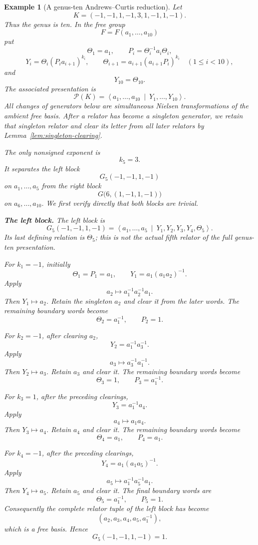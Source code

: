 \documentclass{article}
\newtheorem{example}[theorem]{Example}
\begin{document}
\begin{example}[A genus-ten Andrews--Curtis reduction]
\label{ex:genus-ten-AC-reduction}
Let
\[
 K=(-1,-1,1,-1,3,1,-1,1,-1).
\]
Thus the genus is ten.  In the free group
\[
 F=F(a_1,\ldots,a_{10})
\]
put
\[
 \Theta_1=a_1,
 \qquad
 P_i=\Theta_i^{-1}a_i\Theta_i,
\]
\[
 Y_i=\Theta_i(P_i a_{i+1})^{k_i},
 \qquad
 \Theta_{i+1}=a_{i+1}(a_{i+1}P_i)^{k_i}
 \quad(1\leq i<10),
\]
and
\[
 Y_{10}=\Theta_{10}.
\]
The associated presentation is
\[
 \mathcal P(K)=
 \left\langle
 a_1,\ldots,a_{10}
 \ \middle|\
 Y_1,\ldots,Y_{10}
 \right\rangle.
\]
All changes of generators below are simultaneous Nielsen transformations
of the ambient free basis.  After a relator has become a singleton
generator, we retain that singleton relator and clear its letter from all
later relators by Lemma~\ref{lem:singleton-clearing}.

The only nonsigned exponent is
\[
 k_5=3.
\]
It separates the left block
\[
 G_5(-1,-1,1,-1)
\]
on $a_1,\ldots,a_5$ from the right block
\[
 G\bigl(6,(1,-1,1,-1)\bigr)
\]
on $a_6,\ldots,a_{10}$.  We first verify directly that both blocks are
trivial.

\medskip
\noindent\textbf{The left block.}
The left block is
\[
 G_5(-1,-1,1,-1)
 =
 \left\langle
 a_1,\ldots,a_5
 \ \middle|\
 Y_1,Y_2,Y_3,Y_4,\Theta_5
 \right\rangle.
\]
Its last defining relation is $\Theta_5$; this is not the actual fifth
relator of the full genus-ten presentation.

For $k_1=-1$, initially
\[
 \Theta_1=P_1=a_1,
 \qquad
 Y_1=a_1(a_1a_2)^{-1}.
\]
Apply
\[
 a_2\longmapsto a_1^{-1}a_2^{-1}a_1.
\]
Then $Y_1\mapsto a_2$.  Retain the singleton $a_2$ and clear it from the
later words.  The remaining boundary words become
\[
 \Theta_2=a_1^{-1},
 \qquad
 P_2=1.
\]

For $k_2=-1$, after clearing $a_2$,
\[
 Y_2=a_1^{-1}a_3^{-1}.
\]
Apply
\[
 a_3\longmapsto a_3^{-1}a_1^{-1}.
\]
Then $Y_2\mapsto a_3$.  Retain $a_3$ and clear it.  The remaining
boundary words become
\[
 \Theta_3=1,
 \qquad
 P_3=a_1^{-1}.
\]

For $k_3=1$, after the preceding clearings,
\[
 Y_3=a_1^{-1}a_4.
\]
Apply
\[
 a_4\longmapsto a_1a_4.
\]
Then $Y_3\mapsto a_4$.  Retain $a_4$ and clear it.  The remaining
boundary words become
\[
 \Theta_4=a_1,
 \qquad
 P_4=a_1.
\]

For $k_4=-1$, after the preceding clearings,
\[
 Y_4=a_1(a_1a_5)^{-1}.
\]
Apply
\[
 a_5\longmapsto a_1^{-1}a_5^{-1}a_1.
\]
Then $Y_4\mapsto a_5$.  Retain $a_5$ and clear it.  The final boundary
words are
\[
 \boxed{\Theta_5=a_1^{-1},\qquad P_5=1.}
\]
Consequently the complete relator tuple of the left block has become
\[
 (a_2,a_3,a_4,a_5,a_1^{-1}),
\]
which is a free basis.  Hence
\[
 \boxed{G_5(-1,-1,1,-1)=1.}
\]


\end{example}
\end{document}
